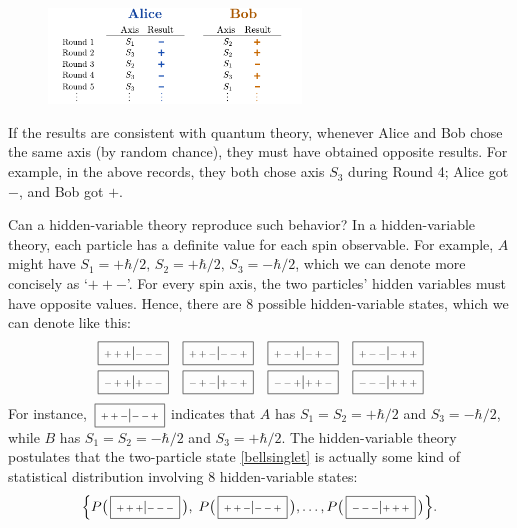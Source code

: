 \documentclass[prx,12pt]{revtex4-2}
\def\hvbox[#1]#2{\,\boxed{\scalebox{0.7}{$\,#1$}|\scalebox{0.7}{$#2\,$}}}
\begin{document}
\begin{figure}[h]
  \centering\includegraphics[width=0.6\textwidth]{bell}
\end{figure}

\noindent
If the results are consistent with quantum theory, whenever Alice and
Bob chose the same axis (by random chance), they must have obtained
opposite results.  For example, in the above records, they both chose
axis $S_3$ during Round 4; Alice got $-$, and Bob got $+$.

Can a hidden-variable theory reproduce such behavior?  In a
hidden-variable theory, each particle has a definite value for each
spin observable.  For example, $A$ might have $S_1 = +\hbar/2, \, S_2
= +\hbar/2, \, S_3 = -\hbar/2$, which we can denote more concisely as
`$++-$'.  For every spin axis, the two particles' hidden variables
must have opposite values.  Hence, there are $8$ possible
hidden-variable states, which we can denote like this:
\begin{align*}
  \begin{aligned}
    \hvbox[+++]{---} \;\;\;
    \hvbox[++-]{--+} \;\;\;
    \hvbox[+-+]{-+-} \;\;\;
    \hvbox[+--]{-++}\\
    \hvbox[-++]{+--} \;\;\;
    \hvbox[-+-]{+-+} \;\;\;
    \hvbox[--+]{++-} \;\;\;
    \hvbox[---]{+++}
  \end{aligned}
\end{align*}
For instance, $\hvbox[++-]{--+}$ indicates that $A$ has $S_1 = S_2 =
+\hbar/2$ and $S_3 = -\hbar/2$, while $B$ has $S_1 = S_2 = -\hbar/2$
and $S_3 = +\hbar/2$.  The hidden-variable theory postulates that the
two-particle state \eqref{bellsinglet} is actually some kind of
statistical distribution involving 8 hidden-variable states:
\begin{equation*}
  \Big\{ P\big(\hvbox[+++]{---}\,\big), \;P\big(\hvbox[++-]{--+}\,\big),
  \dots, P\big(\hvbox[---]{+++}\,\big) \Big\}.
\end{equation*}
\end{document}
